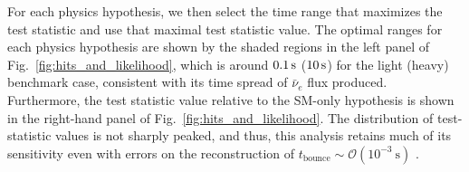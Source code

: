 For each physics hypothesis, we then select the time range that maximizes the test statistic and use that maximal test statistic value. The optimal ranges for each physics hypothesis are shown by the shaded regions in the left panel of Fig.~\ref{fig:hits_and_likelihood}, which is around $\unit[0.1]{s}$ ($\unit[10]{s}$) for the light (heavy) benchmark case, consistent with its time spread of $\bar{\nu}_e$ flux produced. Furthermore, the test statistic value relative to the SM-only hypothesis is shown in the right-hand panel of Fig.~\ref{fig:hits_and_likelihood}.
The distribution of test-statistic values is not sharply peaked, and thus, this analysis retains much of its sensitivity even with errors on the reconstruction of $t_{\mathrm{bounce}}\sim\mathcal{O}\left(10^{-3}~\mathrm{s}\right)$ \cite{Halzen_2009}.